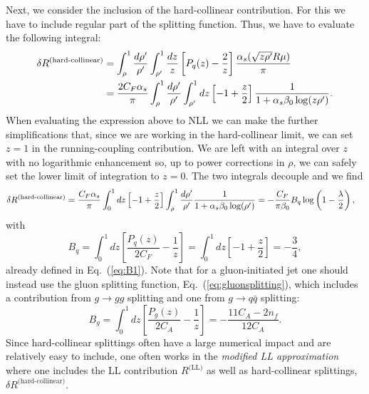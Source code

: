 Next, we consider the inclusion of the hard-collinear contribution. For this we have to include regular part of the splitting function. Thus, we have to evaluate the following integral:
\begin{align}\label{app:analytic-B-term}
  \delta R^\text{(hard-collinear)}
  &= \int_\rho^1 \frac{d \rho'}{\rho'} \int_{\rho'}^1 \frac{d z}{z}\left[P_q(z)- \frac{2}{z} \right] \frac{\alpha_s( \sqrt{z \rho'} R\mu)}{\pi}
\nonumber \\
&= \frac{2C_F \alpha_s }{\pi}  \int_\rho^1 \frac{d \rho'}{\rho'} \int_{\rho'}^1 d z\left[-1+\frac{z}{2} \right] \frac{1}{1+ \alpha_s \beta_0 \log ( z \rho')}.
\end{align}
When evaluating the expression above to NLL we can make the further
simplifications that, since we are working in the hard-collinear
limit, we can set $z=1$ in the running-coupling contribution.
%
We are left with an integral over $z$ with no logarithmic
enhancement so, up to power corrections in $\rho$, we can safely set
the lower limit of integration to $z=0$. The two integrals decouple
and we find
\begin{align}\label{app:analytic-B-term-ctd}
\delta R^\text{(hard-collinear)}
  &= \frac{C_F \alpha_s }{\pi}  \int_{0}^1 dz
    \left[-1+\frac{z}{2} \right]  \int_\rho^1 \frac{d
    \rho'}{\rho'}\frac{1}{1+ \alpha_s \beta_0 \log(\rho')}
  =-\frac{C_F }{\pi \beta_0}B_q \log\left( 1-\frac{\lambda}{2}\right),
\end{align}
with
\begin{equation}\label{eq:definition-B-quark}
  B_q = \int_0^1 dz \left[\frac{P_q(z)}{2C_F}-\frac{1}{z} \right] =  \int_{0}^1 dz \left[-1+\frac{z}{2} \right] = -\frac{3}{4},
\end{equation}
already defined in Eq.~(\ref{eq:B1}).
%
Note that for a gluon-initiated jet one should instead use the gluon
splitting function, Eq.~(\ref{eq:gluonsplitting}), which includes a
contribution from $g\to gg$ splitting and one from $g\to q\bar q$
splitting:
\begin{equation}\label{eq:definition-B-gluon}
  B_g =  \int_0^1 dz \left[\frac{P_g(z)}{2C_A}-\frac{1}{z} \right] =
  -\frac{11 C_A-2n_f}{12 C_A}.
\end{equation}
%
Since hard-collinear splittings often have a large numerical impact
and are relatively easy to include, one often works in the {\em
  modified LL approximation} where one includes the LL contribution
$R^\text{(LL)}$ as well as hard-collinear splittings,
$\delta R^\text{(hard-collinear)}$.

